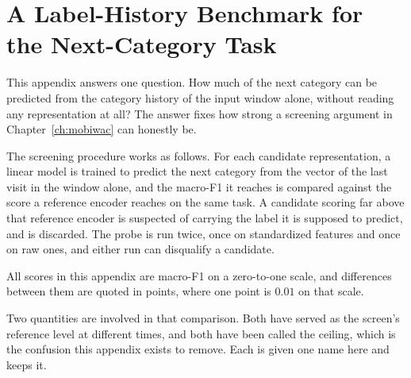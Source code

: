 
\chapter{A Label-History Benchmark for the Next-Category Task}
\label{apx:ceiling}

This appendix answers one question. How much of the next category can be predicted from the
category history of the input window alone, without reading any representation at all? The answer
fixes how strong a screening argument in Chapter~\ref{ch:mobiwac} can honestly be.

The screening procedure works as follows. For each candidate representation, a linear model is
trained to predict the next category from the vector of the last visit in the window alone, and the
macro-F1 it reaches is compared against the score a reference encoder reaches on the same task. A
candidate scoring far above that reference encoder is suspected of carrying the label it is supposed
to predict, and is discarded. The probe is run twice, once on standardized features and
once on raw ones, and either run can disqualify a candidate.

All scores in this appendix are macro-F1 on a zero-to-one scale, and differences between them are
quoted in points, where one point is $0.01$ on that scale.

Two quantities are involved in that comparison. Both have served as the screen's reference level
at different times, and both have been called the ceiling, which is the confusion this appendix
exists to remove. Each is given one name here and keeps it.

